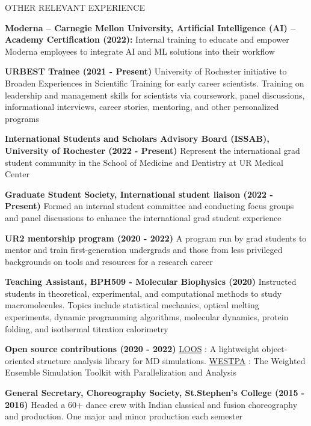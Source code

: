 \documentclass{resume} %
\begin{document}

\begin{rSection}{OTHER RELEVANT EXPERIENCE}
\vspace{-1.25em}
\item \textbf{Moderna – Carnegie Mellon University, Artificial Intelligence (AI) – Academy Certification (2022):} { 
Internal training to educate and empower Moderna employees to integrate AI and ML solutions into their workflow} 
\item \textbf{URBEST Trainee (2021 - Present)} {University of Rochester initiative to Broaden Experiences in Scientific Training for early career scientists. Training on leadership and management skills for scientists via coursework, panel discussions, informational interviews, career stories, mentoring, and other personalized programs}
\item \textbf{International Students and Scholars Advisory Board (ISSAB), University of Rochester (2022 - Present)} {Represent the international grad student community in the School of Medicine and Dentistry at UR Medical Center}
\item \textbf{Graduate Student Society, International student liaison (2022 - Present)} {Formed an internal student committee and conducting focus groups and panel discussions to enhance the international grad student experience}
\item \textbf{UR2 mentorship program (2020 - 2022)} {A program run by grad students to mentor and train first-generation undergrads and those from less privileged backgrounds on tools and resources for a research career}
\item \textbf{Teaching Assistant, BPH509 - Molecular Biophysics (2020)} {Instructed students in theoretical, experimental, and computational methods to study macromolecules. Topics include statistical mechanics, optical melting experiments, dynamic 
programming algorithms, molecular dynamics, protein folding, and isothermal titration calorimetry
}
\item \textbf{Open source contributions (2020 - 2022)} {\href{https://github.com/GrossfieldLab/loos}{LOOS} : A lightweight object-oriented structure analysis library for MD simulations.
\href{https://github.com/westpa/westpa}{WESTPA} : The Weighted Ensemble Simulation Toolkit with Parallelization and Analysis}
\item \textbf{General Secretary, Choreography Society, St.Stephen's College (2015 - 2016)} {Headed a 60+ dance crew with Indian classical and fusion choreography and production. One major and minor production each semester }
\end{rSection} 
\end{document}
